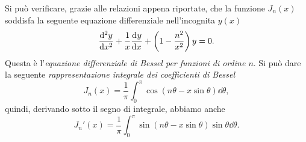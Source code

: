 Si può verificare, grazie alle relazioni appena riportate, che la funzione
$J_n(x)$ soddisfa la seguente equazione differenziale nell'incognita $y(x)$
\begin{equation}
  \toder[2]{y}{x} + \frac{1}{x}\toder{y}{x} +
  \left(
    1 - \frac{n^2}{x^2}
  \right)y = 0.
\end{equation}
Questa è l'\emph{equazione differenziale di Bessel per funzioni di ordine
  $n$}.
Si può dare la seguente \emph{rappresentazione integrale dei coefficienti di
  Bessel}
\begin{equation}
  \label{eq:bessel-integrale}
  J_n(x) = \frac{1}{\pi} \int_0^\pi\cos(n\theta - x\sin\theta)\dd\theta,
\end{equation}
quindi, derivando sotto il segno di integrale, abbiamo anche
\begin{equation}
  \label{eq:bessel-derivata-integrale}
  J_n'(x) = \frac{1}{\pi}\int_0^\pi\sin(n\theta - x\sin\theta)
  \sin\theta\dd\theta.
\end{equation}

